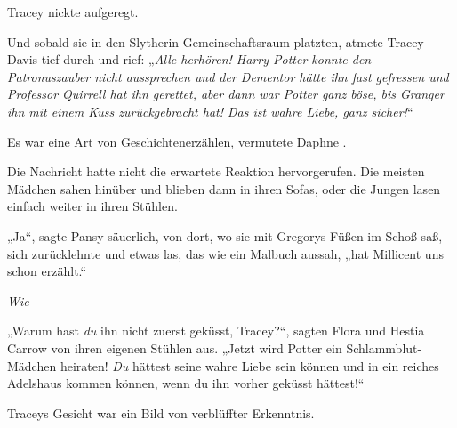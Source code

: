 Tracey nickte aufgeregt.

Und sobald sie in den Slytherin-Gemeinschaftsraum platzten, atmete Tracey Davis tief durch und rief: „\emph{Alle herhören! Harry Potter konnte den Patronuszauber nicht aussprechen und der Dementor hätte ihn fast gefressen und Professor Quirrell hat ihn gerettet, aber dann war Potter ganz böse, bis Granger ihn mit einem Kuss zurückgebracht hat! Das ist wahre Liebe, ganz sicher!}“

Es war eine Art von Geschichtenerzählen, vermutete Daphne .

Die Nachricht hatte nicht die erwartete Reaktion hervorgerufen. Die meisten Mädchen sahen hinüber und blieben dann in ihren Sofas, oder die Jungen lasen einfach weiter in ihren Stühlen.

„Ja“, sagte Pansy säuerlich, von dort, wo sie mit Gregorys Füßen im Schoß saß, sich zurücklehnte und etwas las, das wie ein Malbuch aussah, „hat Millicent uns schon erzählt.“

\emph{Wie —}

„Warum hast \emph{du} ihn nicht zuerst geküsst, Tracey?“, sagten Flora und Hestia Carrow von ihren eigenen Stühlen aus. „Jetzt wird Potter ein Schlammblut-Mädchen heiraten! \emph{Du} hättest seine wahre Liebe sein können und in ein reiches Adelshaus kommen können, wenn du ihn vorher geküsst hättest!“

Traceys Gesicht war ein Bild von verblüffter Erkenntnis.

